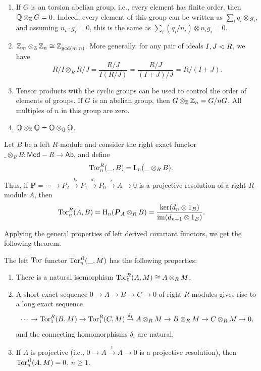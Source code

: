 \begin{example}
    \begin{enumerate}
        \item If $G$ is an torsion abelian group, i.e., every element has finite order, then $\mathbb{Q}\otimes_{\mathbb{Z}} G=0$. Indeed, every element of this group can be written as $\sum_i q_i\otimes g_i$, and assuming $n_i\cdot g_i=0$, this is the same as $\sum_i (q_i/n_i)\otimes n_ig_i=0$.
        \item $\mathbb{Z}_m\otimes_{\mathbb{Z}} \mathbb{Z}_n\cong \mathbb{Z}_{\gcd(m,n)}$. More generally, for any pair of ideals $I,J\vartriangleleft R$, we have
         \[R\slash I\otimes_R R\slash J=\frac{R\slash J}{I(R\slash J)}=\frac{R\slash J}{(I+J)/J}=R\slash(I+J).\]
        \item Tensor products with the cyclic groups can be used to control the order of elements of groups. If $G$ is an abelian group, then $G\otimes_{\mathbb{Z}} \mathbb{Z}_n=G\slash nG$. All multiples of $n$ in this group are zero.
        \item $\mathbb{Q}\otimes_{\mathbb{Z}}\mathbb{Q}=\mathbb{Q}\otimes_{\mathbb{Q}}\mathbb{Q}$. 
    \end{enumerate}
\end{example}


\begin{defn}
    Let $B$ be a left $R$-module and consider the right exact functor $\_\otimes_R B:\mathsf{Mod-}R\to \mathsf{Ab}$, and define
    \[\operatorname{Tor}_n^R(\_,B)=\mathrm{L}_n(\_\otimes_R B).\]
    Thus, if $\bm{P}=\cdots\to P_2\overset{d_2}{\to}P_1\overset{d_1}{\to}P_0\overset{\epsilon}{\to}A\to 0$ is a projective resolution of a right $R$-module $A$, then
    \[\operatorname{Tor}_n^R(A,B)=\mathrm{H}_n(\boldsymbol{P}_A\otimes_R B)=\frac{\ker(d_n\otimes 1_B)}{\operatorname{im}(d_{n+1}\otimes 1_B)}.\]
\end{defn}

Applying the general properties of left derived covariant functors, we get the following theorem.

\begin{thm}\label{thm Tor properties}
    The left $\operatorname{Tor}$ functor $\operatorname{Tor}_n^R(\_,M)$ has the following properties:
    \begin{enumerate}
        \item There is a natural isomorphism $\operatorname{Tor}_0^R(A,M)\cong A\otimes_R M$.
        \item A short exact sequence $0\to A\to B\to C\to 0$ of right $R$-modules gives rise to a long exact sequence 
        \[\cdots\to \operatorname{Tor}_1^R(B,M)\to \operatorname{Tor}_1^R(C,M)\overset{\delta_1}{\to} A\otimes_R M\to B\otimes_R M\to C\otimes_R M\to 0,\]
        and the connecting homomorphisms $\delta_i$ are natural.
        \item If $A$ is projective (i.e., $0\to A\overset{1}{\to} A\to 0$ is a projective resolution), then $\operatorname{Tor}_n^R(A,M)=0$, $n\geq 1$.
    \end{enumerate}
\end{thm}

